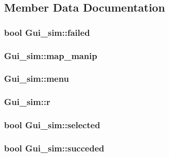 \subsection{Member Data Documentation}
\hypertarget{class_gui__sim_a2c1abe69c173fe35195a492380b77f1b}{
\subsubsection[{failed}]{\setlength{\rightskip}{0pt plus 5cm}bool Gui\-\_\-sim\-::failed}}\label{class_gui__sim_a2c1abe69c173fe35195a492380b77f1b}
\hypertarget{class_gui__sim_ae7cb7c801fd02dbc2602252f9de2a748}{
\subsubsection[{map\-\_\-manip}]{ Gui\-\_\-sim\-::map\-\_\-manip}}\label{class_gui__sim_ae7cb7c801fd02dbc2602252f9de2a748}
\hypertarget{class_gui__sim_a45c06161fcea360f6a0beb071827e3b1}{
\subsubsection[{menu}]{ Gui\-\_\-sim\-::menu}}\label{class_gui__sim_a45c06161fcea360f6a0beb071827e3b1}
\hypertarget{class_gui__sim_ae78a76d8502b6a79cf582769af82dbd4}{
\subsubsection[{r}]{ Gui\-\_\-sim\-::r}}\label{class_gui__sim_ae78a76d8502b6a79cf582769af82dbd4}
\hypertarget{class_gui__sim_a2be104727246fbe590044d9dc021eb47}{
\subsubsection[{selected}]{\setlength{\rightskip}{0pt plus 5cm}bool Gui\-\_\-sim\-::selected}}\label{class_gui__sim_a2be104727246fbe590044d9dc021eb47}
\hypertarget{class_gui__sim_a30d3113e5b0c640c6a06c57948fbec55}{
\subsubsection[{succeded}]{\setlength{\rightskip}{0pt plus 5cm}bool Gui\-\_\-sim\-::succeded}}\label{class_gui__sim_a30d3113e5b0c640c6a06c57948fbec55}


